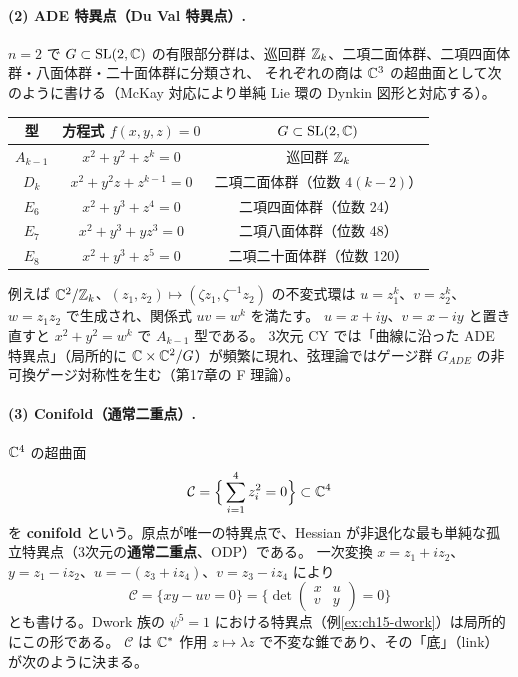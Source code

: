 \paragraph{(2) ADE 特異点（Du Val 特異点）.}
$n=2$ で $G\subset\operatorname{SL}(2,\mathbb{C})$ の有限部分群は、巡回群 $\mathbb{Z}_k$、二項二面体群、二項四面体群・八面体群・二十面体群に分類され、
それぞれの商は $\mathbb{C}^3$ の超曲面として次のように書ける（McKay 対応により単純 Lie 環の Dynkin 図形と対応する）。
\begin{center}
\renewcommand{\arraystretch}{1.3}
\begin{tabular}{c|c|c}
型 & 方程式 $f(x,y,z) = 0$ & $G\subset\operatorname{SL}(2,\mathbb{C})$ \\ \hline
$A_{k-1}$ & $x^2+y^2+z^{k} = 0$ & 巡回群 $\mathbb{Z}_k$ \\
$D_{k}$ & $x^2+y^2z+z^{k-1} = 0$ & 二項二面体群（位数 $4(k-2)$）\\
$E_6$ & $x^2+y^3+z^4 = 0$ & 二項四面体群（位数 24）\\
$E_7$ & $x^2+y^3+yz^3 = 0$ & 二項八面体群（位数 48）\\
$E_8$ & $x^2+y^3+z^5 = 0$ & 二項二十面体群（位数 120）\\
\end{tabular}
\end{center}
例えば $\mathbb{C}^2/\mathbb{Z}_k$、$(z_1,z_2)\mapsto(\zeta z_1,\zeta^{-1}z_2)$ の不変式環は $u = z_1^k$、$v = z_2^k$、$w = z_1z_2$ で生成され、関係式 $uv = w^k$ を満たす。
$u = x+iy$、$v = x-iy$ と置き直すと $x^2+y^2 = w^k$ で $A_{k-1}$ 型である。
3次元 CY では「曲線に沿った ADE 特異点」（局所的に $\mathbb{C}\times\mathbb{C}^2/G$）が頻繁に現れ、弦理論ではゲージ群 $G_{ADE}$ の非可換ゲージ対称性を生む（第17章の F 理論）。

\paragraph{(3) Conifold（通常二重点）.}
$\mathbb{C}^4$ の超曲面
\[
\mathcal{C} = \Big\{\sum_{i=1}^4z_i^2 = 0\Big\}\subset\mathbb{C}^4
\]
を \textbf{conifold} という。原点が唯一の特異点で、Hessian が非退化な最も単純な孤立特異点（3次元の\textbf{通常二重点}、ODP）である。
一次変換 $x = z_1+iz_2$、$y = z_1-iz_2$、$u = -(z_3+iz_4)$、$v = z_3-iz_4$ により
\[
\mathcal C = \{xy - uv = 0\} = \Big\{\det\begin{pmatrix}x&u\\v&y\end{pmatrix} = 0\Big\}
\]
とも書ける。Dwork 族の $\psi^5 = 1$ における特異点（例\ref{ex:ch15-dwork}）は局所的にこの形である。
$\mathcal C$ は $\mathbb{C}^*$ 作用 $z\mapsto\lambda z$ で不変な錐であり、その「底」（link）が次のように決まる。

